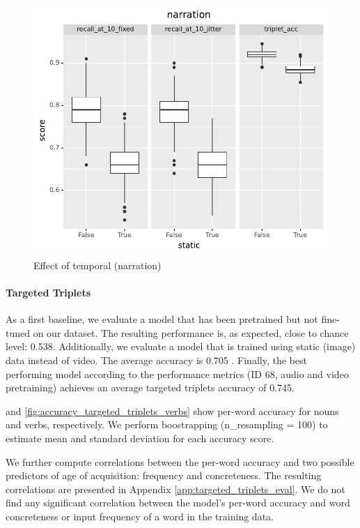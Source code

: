 \begin{figure}
  \centering
  \includegraphics[width=\textwidth]{results/slides/static_narration.pdf}
  \caption{Effect of temporal (narration)}
  \label{fig:static-narration}
\end{figure}

\paragraph{Targeted Triplets}
As a first baseline, we evaluate a model that has been pretrained but not fine-tuned on our dataset. The resulting performance is, as expected, close to chance level: 0.538. Additionally, we evaluate a model that is trained using static (image) data instead of video. The average accuracy is 0.705 . Finally, the best performing model according to the
performance metrics (ID 68, audio and video pretraining) achieves an average
targeted triplets accuracy of 0.745.

 and
\ref{fig:accuracy_targeted_triplets_verbs} show per-word
accuracy for nouns and verbs, respectively. We perform boostrapping (n\_resampling = 100) to estimate mean and standard deviation for each accuracy score.

We further compute correlations between the per-word accuracy and two possible predictors of age of acquisition: frequency and concreteness. The resulting correlations are presented in Appendix \ref{app:targeted_triplets_eval}. We do not find any significant correlation between the model's per-word accuracy and word concreteness or input frequency of a word in the training data.




